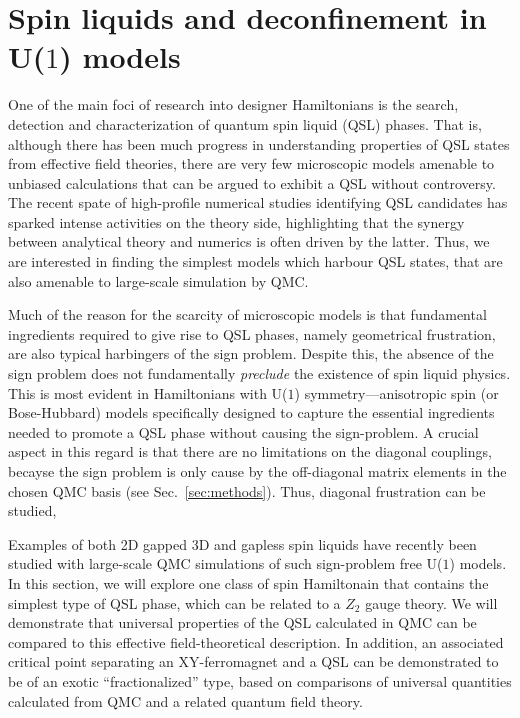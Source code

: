 \documentclass[range]{ar2e}
\begin{document}
\section{Spin liquids and deconfinement in U($1$) models}
\label{sec:u1models}

One of the main foci of research into designer Hamiltonians is the search, detection and characterization of quantum spin liquid (QSL) phases.  That is, although there 
has been much progress in understanding properties of QSL states from effective field theories, there are very few microscopic models amenable to unbiased calculations 
that can be argued to exhibit a QSL without controversy. The recent spate of high-profile numerical studies identifying QSL candidates \cite{Yan, Meng,J1J2} has sparked 
intense activities on the theory side, highlighting that the synergy between analytical theory and numerics is often driven by the latter.  Thus, we are interested in 
finding the simplest models which harbour QSL states, that are also amenable to large-scale simulation by QMC.

Much of the reason for the scarcity of microscopic models is that fundamental ingredients required to give rise to QSL phases, namely geometrical frustration, are also typical 
harbingers of the sign problem.  Despite this, the absence of the sign problem does not fundamentally {\it preclude} the existence of spin liquid physics.  This is most evident 
in Hamiltonians with U($1$) symmetry---anisotropic spin (or Bose-Hubbard) models specifically designed to capture the essential ingredients needed to promote a QSL phase without 
causing the sign-problem. A crucial aspect in this regard is that there are no limitations on the diagonal couplings, becayse the sign problem is only cause by the off-diagonal
matrix elements in the chosen QMC basis (see Sec.~\ref{sec:methods}). Thus, diagonal frustration can be studied,

Examples of both 2D gapped \cite{Isakov1,Isakov2,Long,TopoEE} 3D and gapless \cite{Isakov3} spin liquids have recently been studied with large-scale QMC simulations of 
such sign-problem free U($1$) models. In this section, we will explore one class of spin Hamiltonain that contains the simplest type of QSL phase, which can be related to a 
$Z_2$ gauge theory.  We will demonstrate that universal properties of the QSL calculated in QMC can be compared to this effective field-theoretical description.  In addition, 
an associated critical point separating an XY-ferromagnet and a QSL can be demonstrated to be of an exotic ``fractionalized'' type, based on comparisons of universal 
quantities calculated from QMC and a related quantum field theory.
\end{document}
